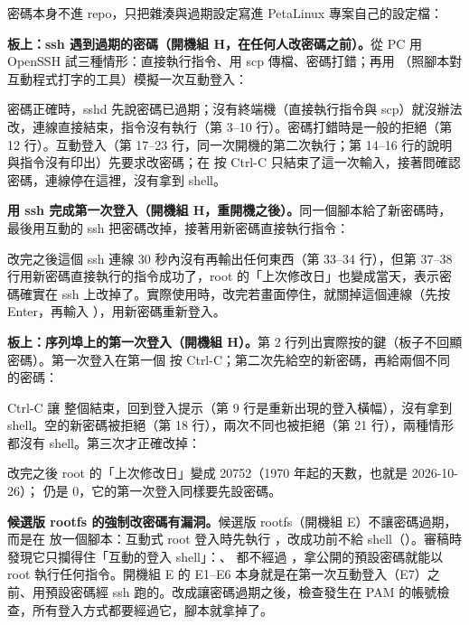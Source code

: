 密碼本身不進 repo，只把雜湊與過期設定寫進 PetaLinux 專案自己的設定檔：


\textbf{板上：ssh 遇到過期的密碼（開機組 H，在任何人改密碼之前）。}從 PC 用 OpenSSH 試三種情形：直接執行指令、用 scp 傳檔、密碼打錯；再用 （照腳本對互動程式打字的工具）模擬一次互動登入：


密碼正確時，sshd 先說密碼已過期；沒有終端機（直接執行指令與 scp）就沒辦法改，連線直接結束，指令沒有執行（第 3--10 行）。密碼打錯時是一般的拒絕（第 12 行）。互動登入（第 17--23 行，同一次開機的第二次執行；第 14--16 行的說明與指令沒有印出）先要求改密碼；在  按 Ctrl-C 只結束了這一次輸入，接著問確認密碼，連線停在這裡，沒有拿到 shell。

\textbf{用 ssh 完成第一次登入（開機組 H，重開機之後）。}同一個腳本給了新密碼時，最後用互動的 ssh 把密碼改掉，接著用新密碼直接執行指令：


改完之後這個 ssh 連線 30 秒內沒有再輸出任何東西（第 33--34 行），但第 37--38 行用新密碼直接執行的指令成功了，root 的「上次修改日」也變成當天，表示密碼確實在 ssh 上改掉了。實際使用時，改完若畫面停住，就關掉這個連線（先按 Enter，再輸入 ），用新密碼重新登入。

\textbf{板上：序列埠上的第一次登入（開機組 H）。}第 2 行列出實際按的鍵（板子不回顯密碼）。第一次登入在第一個  按 Ctrl-C；第二次先給空的新密碼，再給兩個不同的密碼：


Ctrl-C 讓  整個結束，回到登入提示（第 9 行是重新出現的登入橫幅），沒有拿到 shell。空的新密碼被拒絕（第 18 行），兩次不同也被拒絕（第 21 行），兩種情形都沒有 shell。第三次才正確改掉：


改完之後 root 的「上次修改日」變成 20752（1970 年起的天數，也就是 2026-10-26）； 仍是 0，它的第一次登入同樣要先設密碼。

\begin{pit}
\textbf{候選版 rootfs 的強制改密碼有漏洞。}候選版 rootfs（開機組 E）不讓密碼過期，而是在  放一個腳本：互動式 root 登入時先執行 ，改成功前不給 shell（）。審稿時發現它只攔得住「互動的登入 shell」：、 都不經過 ，拿公開的預設密碼就能以 root 執行任何指令。開機組 E 的 E1--E6 本身就是在第一次互動登入（E7）之前、用預設密碼經 ssh 跑的。改成讓密碼過期之後，檢查發生在 PAM 的帳號檢查，所有登入方式都要經過它，腳本就拿掉了。
\end{pit}

